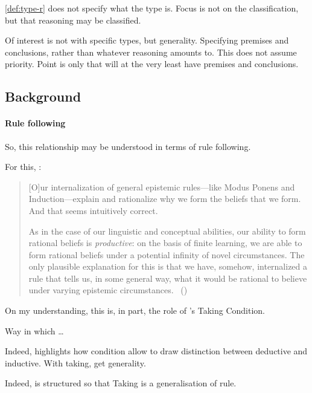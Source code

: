 \begin{note}
  \autoref{def:type-r} does not specify what the type is.
  Focus is not on the classification, but that reasoning may be classified.
\end{note}

\begin{note}
  Of interest is not with specific types, but generality.
  Specifying premises and conclusions, rather than whatever reasoning amounts to.
  This does not assume priority.
  Point is only that will at the very least have premises and conclusions.
\end{note}

\subsection{Background}
\label{cha:typical:sec:tor:bkgd}

\paragraph{Rule following}

\begin{note}
  So, this relationship may be understood in terms of rule following.

  For this, \citeauthor{Boghossian:2008vf}:

  \begin{quote}
    [O]ur internalization of general epistemic rules---like Modus Ponens and Induction---explain and rationalize why we form the beliefs that we form.
    And that seems intuitively correct.

    As in the case of our linguistic and conceptual abilities, our ability to form rational beliefs is \emph{productive}: on the basis of finite learning, we are able to form rational beliefs under a potential infinity of novel circumstances.
    The only plausible explanation for this is that we have, somehow, internalized a rule that tells us, in some general way, what it would be rational to believe under varying epistemic circumstances.%
    \mbox{ }\hfill\mbox{(\citeyear[483]{Boghossian:2008vf})}
  \end{quote}
\end{note}

\begin{note}
  On my understanding, this is, in part, the role of \citeauthor{Boghossian:2014aa}'s Taking Condition.

  Way in which \dots

  Indeed, \citeauthor{Boghossian:2014aa} highlights how condition allow to draw distinction between deductive and inductive.
  With taking, get generality.

  Indeed, \textcite{Boghossian:2014aa} is structured so that Taking is a generalisation of rule.
\end{note}

